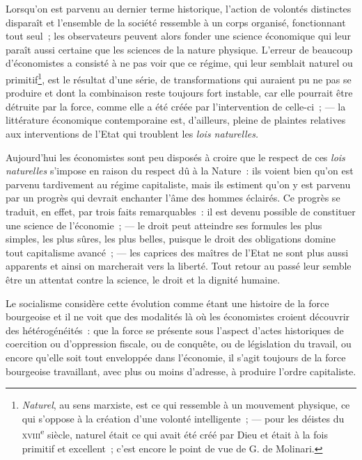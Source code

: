 \documentclass[french,twoside]{book} %
\begin{document}
Lorsqu’on est parvenu au dernier terme historique, l’action de volontés distinctes disparaît et l’ensemble de la société ressemble à un corps organisé, fonctionnant tout seul ; les observateurs peuvent alors fonder une science économique qui leur paraît aussi certaine que les sciences de la nature physique. L’erreur de beaucoup d’économistes a consisté à ne pas voir que ce régime, qui leur semblait naturel ou primitif\footnote{ \noindent \emph{Naturel}, au sens marxiste, est ce qui ressemble à un mouvement physique, ce qui s’oppose à la création d’une volonté intelligente ; — pour les déistes du {\scshape xviii}\textsuperscript{e} siècle, naturel était ce qui avait été créé par Dieu et était à la fois primitif et excellent ; c’est encore le point de vue de G. de Molinari.
 }, est le résultat d’une série, de transformations qui auraient pu ne pas se produire et dont la combinaison reste toujours fort instable,  car elle pourrait être détruite par la force, comme elle a été créée par l’intervention de celle-ci ; — la littérature économique contemporaine est, d’ailleurs, pleine de plaintes relatives aux interventions de l’Etat qui troublent les \emph{lois naturelles.}\par
Aujourd’hui les économistes sont peu disposés à croire que le respect de ces \emph{lois naturelles} s’impose en raison du respect dû à la Nature : ils voient bien qu’on est parvenu tardivement au régime capitaliste, mais ils estiment qu’on y est parvenu par un progrès qui devrait enchanter l’âme des hommes éclairés. Ce progrès se traduit, en effet, par trois faits remarquables : il est devenu possible de constituer une science de l’économie ; — le droit peut atteindre ses formules les plus simples, les plus sûres, les plus belles, puisque le droit des obligations domine tout capitalisme avancé ; — les caprices des maîtres de l’Etat ne sont plus aussi apparents et ainsi on marcherait vers la liberté. Tout retour au passé leur semble être un attentat contre la science, le droit et la dignité humaine.\par
Le socialisme considère cette évolution comme étant une histoire de la force bourgeoise et il ne voit que des modalités là où les économistes croient découvrir des hétérogénéités : que la force se présente sous l’aspect d’actes historiques de coercition ou d’oppression fiscale, ou de conquête, ou de législation du travail, ou encore qu’elle soit tout enveloppée dans l’économie, il s’agit toujours de la force bourgeoise travaillant, avec plus ou moins d’adresse, à produire l’ordre capitaliste.\par
\end{document}
